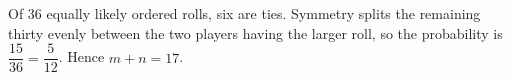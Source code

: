 Of $36$ equally likely ordered rolls, six are ties. Symmetry splits the remaining thirty evenly between the two players having the larger roll, so the probability is $\dfrac{15}{36}=\dfrac{5}{12}$. Hence $m+n=\boxed{17}$.
